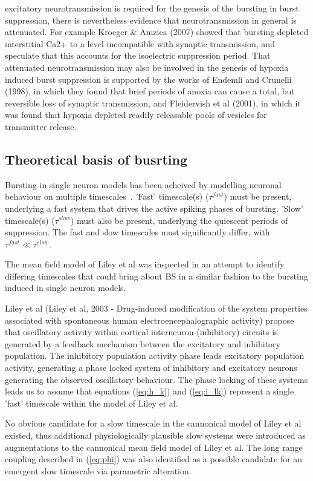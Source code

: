 \documentclass[a4paper,12pt]{article}
\begin{document}
excitatory neurotransmission is required for the genesis of the bursting
in burst suppression, there is nevertheless evidence that
neurotransmission in general is attenuated. For example Kroeger \&
Amzica (2007) showed that bursting depleted interstitial Ca2+ to a
level incompatible with synaptic transmission, and speculate that this
accounts for the isoelectric suppression period. That attenuated
neurotransmission may also be involved in the genesis of hypoxia
induced burst suppression is supported by the works of Endemli and
Crunelli (1998), in which they found that brief periods of anoxia can
cause a total, but reversible loss of synaptic transmission, and
Fleidervish et al (2001), in which it was found that hypoxia depleted
readily releasable pools of vesicles for transmitter release.

\subsection{Theoretical basis of busrting}
Bursting in single neuron models has been acheived by modelling neuronal behaviour on multiple timescales~\cite{izikevich2007_1}. 'Fast' timescale(s) ($\tau^{fast}$) must be present, underlying a fast system that drives the active spiking phases of bursting. 'Slow' timescale(s) ($\tau^{slow}$) must also be present, underlying the quiescent periods of suppression. The fast and slow timescales must significantly differ, with $\tau^{fast} \ll \tau^{slow}$. 

The mean field model of Liley et al was inspected in an attempt to identify differing timescales that could bring about BS in a similar fashion to the bursting induced in single neuron models. 

Liley et al (Liley et al, 2003 - Drug-induced modification of the system properties associated
with spontaneous human electroencephalographic activity) propose that oscillatory activity within cortical interneuron
(inhibitory) circuits is generated by a feedback mechanism between the excitatory and inhibitory population.
The inhibitory population activity phase leads excitatory population activity, generating a phase locked system of
inhibitory and excitatory neurons generating the observed oscillatory behaviour. The phase locking of these systems leads us to assume that equations (\ref{eq:h_k}) and (\ref{eq:i_lk}) represent a single 'fast'
timescale within the model of Liley et al. 

No obvious candidate for a slow timescale in the cannonical model of Liley et al existed, thus additional physiologically plausible slow systems were introduced as augmentations to the cannonical mean field model of Liley et al. The long range coupling described in (\ref{eq:phi}) was also identified as a possible candidate for an emergent slow timescale via parametric alteration.
\end{document}

